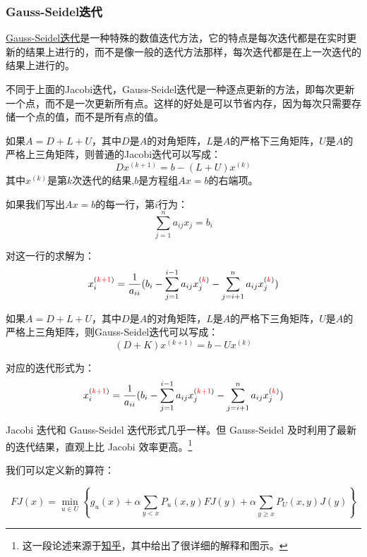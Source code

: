 \subsubsection{Gauss-Seidel迭代}

\href{https://en.wikipedia.org/wiki/Gauss%E2%80%93Seidel_method}{Gauss-Seidel迭代}是一种特殊的数值迭代方法，它的特点是每次迭代都是在实时更新的结果上进行的，而不是像一般的迭代方法那样，每次迭代都是在上一次迭代的结果上进行的。

不同于上面的Jacobi迭代，Gauss-Seidel迭代是一种逐点更新的方法，即每次更新一个点，而不是一次更新所有点。这样的好处是可以节省内存，因为每次只需要存储一个点的值，而不是所有点的值。

如果$A=D+L+U$，其中$D$是$A$的对角矩阵，$L$是$A$的严格下三角矩阵，$U$是$A$的严格上三角矩阵，则普通的Jacobi迭代可以写成：
\begin{equation}
    Dx^{(k+1)}=b-(L+U)x^{(k)}
\end{equation}
其中$x^{(k)}$是第$k$次迭代的结果,$b$是方程组$Ax=b$的右端项。

如果我们写出$Ax=b$的每一行，第$i$行为：
\begin{equation}
    \sum_{j=1}^{n}a_{ij}x_j=b_i
\end{equation}

对这一行的求解为：
\begin{equation}
    x_i^{({\color{red}k+1})}=\frac{1}{a_{ii}}(b_i-\sum_{j=1}^{i-1}a_{ij}x_j^{({\color{red}k})}-\sum_{j=i+1}^{n}a_{ij}x_j^{({\color{red}k})})
\end{equation}

如果$A=D+L+U$，其中$D$是$A$的对角矩阵，$L$是$A$的严格下三角矩阵，$U$是$A$的严格上三角矩阵，则Gauss-Seidel迭代可以写成：
\begin{equation}
    (D+K)x^{(k+1)}=b-Ux^{(k)}
\end{equation}

对应的迭代形式为：
\begin{equation}
    x_i^{({\color{red}k+1})}=\frac{1}{a_{ii}}(b_i-\sum_{j=1}^{i-1}a_{ij}x_j^{({\color{red}k+1})}-\sum_{j=i+1}^{n}a_{ij}x_j^{({\color{red}k})})
\end{equation}

Jacobi 迭代和 Gauss-Seidel 迭代形式几乎一样。但 Gauss-Seidel 及时利用了最新的迭代结果，直观上比 Jacobi 效率更高。\footnote{这一段论述来源于\href{https://zhuanlan.zhihu.com/p/389389672}{知乎}，其中给出了很详细的解释和图示。}

我们可以定义新的算符：

\begin{equation}
    FJ(x)=\min_{u\in U}\left\{ g_u(x)+\alpha\sum_{y<x}P_u(x,y)FJ(y)+\alpha \sum_{y\geq x}P_U(x,y)J(y)\right\}
\end{equation}

